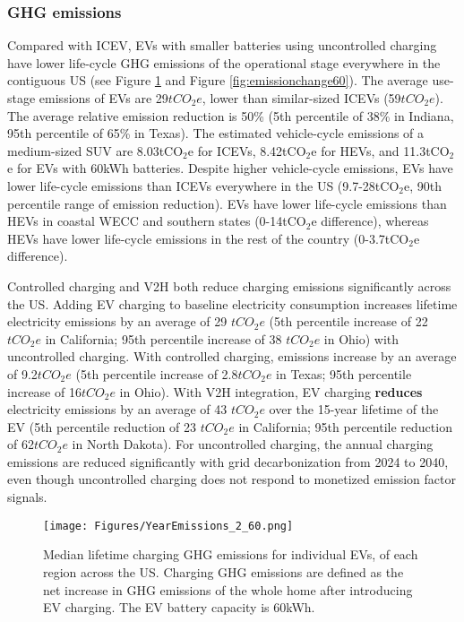 \documentclass[11pt,preprint]{elsarticle}
\begin{document}
\subsubsection{GHG emissions}

Compared with ICEV, EVs with smaller batteries using uncontrolled charging have lower life-cycle GHG emissions of the operational stage everywhere in the contiguous US (see Figure \ref{fig:yearemission60} and Figure \ref{fig:emissionchange60}). The average use-stage emissions of EVs are 29$tCO_2e$, lower than similar-sized ICEVs (59$tCO_2e$). The average relative emission reduction is 50\% (5th percentile of 38\% in Indiana, 95th percentile of 65\% in Texas). The estimated vehicle-cycle emissions of a medium-sized SUV are 8.03tCO$_2$e for ICEVs, 8.42tCO$_2$e for HEVs, and 11.3tCO$_2$e for EVs with 60kWh batteries. Despite higher vehicle-cycle emissions, EVs have lower life-cycle emissions than ICEVs everywhere in the US (9.7-28tCO$_2$e, 90th percentile range of emission reduction). EVs have lower life-cycle emissions than HEVs in coastal WECC and southern states (0-14tCO$_2$e difference), whereas HEVs have lower life-cycle emissions in the rest of the country (0-3.7tCO$_2$e difference).

Controlled charging and V2H both reduce charging emissions significantly across the US. Adding EV charging to baseline electricity consumption increases lifetime electricity emissions by an average of 29 $tCO_2e$ (5th percentile increase of 22 $tCO_2e$ in California; 95th percentile increase of 38 $tCO_2e$ in Ohio) with uncontrolled charging. With controlled charging, emissions increase by an average of 9.2$tCO_2e$ (5th percentile increase of 2.8$tCO_2e$ in Texas; 95th percentile increase of 16$tCO_2e$ in Ohio). With V2H integration, EV charging \textbf{reduces} electricity emissions by an average of 43 $tCO_2e$ over the 15-year lifetime of the EV (5th percentile reduction of 23 $tCO_2e$ in California; 95th percentile reduction of 62$tCO_2e$ in North Dakota). For uncontrolled charging, the annual charging emissions are reduced significantly with grid decarbonization from 2024 to 2040, even though uncontrolled charging does not respond to monetized emission factor signals. 

\begin{figure}[H]
    \centering
    \texttt{[image: Figures/YearEmissions\_2\_60.png]}
    \caption{Median lifetime charging GHG emissions for individual EVs, of each region across the US. Charging GHG emissions are defined as the net increase in GHG emissions of the whole home after introducing EV charging. The EV battery capacity is 60kWh.}
    \label{fig:yearemission60}
\end{figure}
\end{document}
